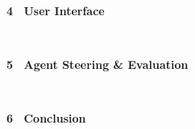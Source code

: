 \documentclass[portrait,a0,final]{a0poster}
\def\exMinipage{787mm}
\def\exRightMinipage{485mm}
\def\exRightSubMinipage{477mm}
\begin{document}
{{{\begin{minipage}[t]{\exMinipage}
\begin{minipage}[t]{\exRightMinipage}
\begin{minipage}[t]{\exRightMinipage}%
\LARGE{\textcolor{\backgroundcolortitle}{   \bf 4 \ User Interface}}\\[-10pt]
\begin{minipage}[t]{\exRightSubMinipage}
\begin{mdframed}[style=smallframe-white, innertopmargin=6pt, innerbottommargin=6pt, innerleftmargin=4pt, innerrightmargin=4pt]
\materialstext
\end{mdframed}
\end{minipage}
\end{minipage}%
\\[4pt]
\begin{minipage}[t]{\exRightMinipage}%
\LARGE{\textcolor{\backgroundcolortitle}{  \bf 5 \ Agent Steering \& Evaluation}}\\[-10pt]
\begin{minipage}[t]{\exRightSubMinipage}
\begin{mdframed}[style=smallframe-white, innertopmargin=4pt, innerbottommargin=4pt]
\agentsteering
\end{mdframed}
\end{minipage}
\end{minipage}%
\\[4pt]
\begin{minipage}[t]{\exRightMinipage}%
\LARGE{\textcolor{\backgroundcolortitle}{  \bf 6 \ Conclusion}}\\[-10pt]
\begin{minipage}[t]{\exRightSubMinipage}
\begin{mdframed}[style=smallframe-color, innertopmargin=4pt, innerbottommargin=4pt]
\conclusiontext
\end{mdframed}
\end{minipage}
\end{minipage}%

\end{minipage}\\[15pt]%
\end{minipage}%
}
\\[10pt]
\begin{minipage}[l]{\exMinipage}
{
\partner
}
\end{minipage}
}} %
\end{document}
